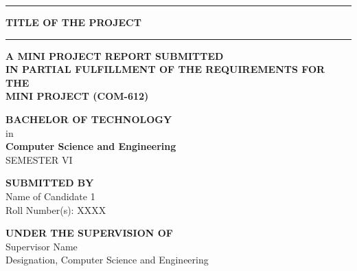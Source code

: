 \documentclass[12pt,a4paper]{report}
\newcommand{\projecttitle}{TITLE OF THE PROJECT}
\newcommand{\studentA}{Name of Candidate 1}
\newcommand{\rollA}{XXXX}
\newcommand{\supervisor}{Supervisor Name}
\newcommand{\supervisordesig}{Designation, Computer Science and Engineering}
\numberwithin{equation}{chapter}
\newcommand{\coverrule}{\color{mietgold}\rule{0.78\textwidth}{0.8pt}}
\begin{document}
\begin{titlepage}
\thispagestyle{titlepage}
\begin{center}

\vspace*{0.85cm}

{\coverrule}

\vspace{0.7cm}

{\fontsize{18}{22}\selectfont \textbf{\textcolor{mietblue}{\projecttitle}}}

\vspace{0.7cm}

{\coverrule}

\vspace{0.85cm}

{\fontsize{14}{17}\selectfont \textbf{A MINI PROJECT REPORT SUBMITTED}}\\[0.15cm]
{\fontsize{14}{17}\selectfont \textbf{IN PARTIAL FULFILLMENT OF THE REQUIREMENTS FOR THE}}\\[0.15cm]
{\fontsize{14}{17}\selectfont \textbf{MINI PROJECT (COM-612)}}

\vspace{0.75cm}

{\fontsize{16}{19}\selectfont \textbf{\textcolor{mietblue}{BACHELOR OF TECHNOLOGY}}}\\[0.2cm]
{\fontsize{14}{17}\selectfont in}\\[0.2cm]
{\fontsize{16}{19}\selectfont \textbf{\textcolor{mietblue}{Computer Science and Engineering}}}\\[0.15cm]
{\fontsize{14}{17}\selectfont SEMESTER VI}

\vspace{0.75cm}

{\fontsize{12}{14}\selectfont \textbf{SUBMITTED BY}}\\[0.18cm]
{\fontsize{12}{14}\selectfont \studentA}\\[0.06cm]
{\fontsize{12}{14}\selectfont Roll Number(s): \rollA}

\vspace{0.45cm}

{\fontsize{12}{14}\selectfont \textbf{UNDER THE SUPERVISION OF}}\\[0.14cm]
{\fontsize{12}{14}\selectfont \supervisor}\\[0.06cm]
{\fontsize{12}{14}\selectfont \supervisordesig}

\vspace{0.35cm}


\end{center}
\end{titlepage}
\end{document}
